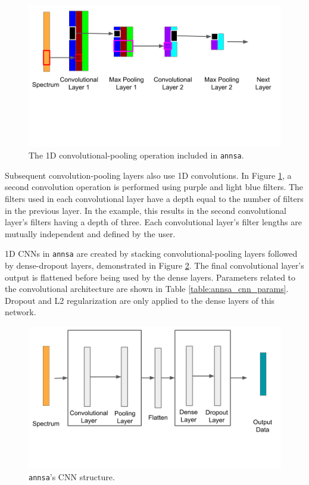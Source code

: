 \begin{figure}[H]
	\centering
	\includegraphics[trim=0 150 40 0,clip,width=0.8\linewidth]{images/annsa_cnn_fine.png}
	\caption{The 1D convolutional-pooling operation included in \texttt{annsa}.}
	\label{fig:annsa_cnn_fine}
\end{figure}

Subsequent convolution-pooling layers also use 1D convolutions. In Figure \ref{fig:annsa_cnn_fine}, a second convolution operation is performed using purple and light blue filters. The filters used in each convolutional layer have a depth equal to the number of filters in the previous layer. In the example, this results in the second convolutional layer's filters having a depth of three. Each convolutional layer's filter lengths are mutually independent and defined by the user.


1D CNNs in \verb|annsa| are created by stacking convolutional-pooling layers followed by dense-dropout layers, demonstrated in Figure \ref{fig:annsa_cnn}. The final convolutional layer's output is flattened before being used by the dense layers. Parameters related to the convolutional architecture are shown in Table \ref{table:annsa_cnn_params}. Dropout and L2 regularization are only applied to the dense layers of this network.

\begin{figure}[H]
\centering
\includegraphics[trim=0 75 20 0,clip,width=0.8\linewidth]{images/annsa_cnn.png}
\caption{\texttt{annsa}'s CNN structure.}
\label{fig:annsa_cnn}
\end{figure}

